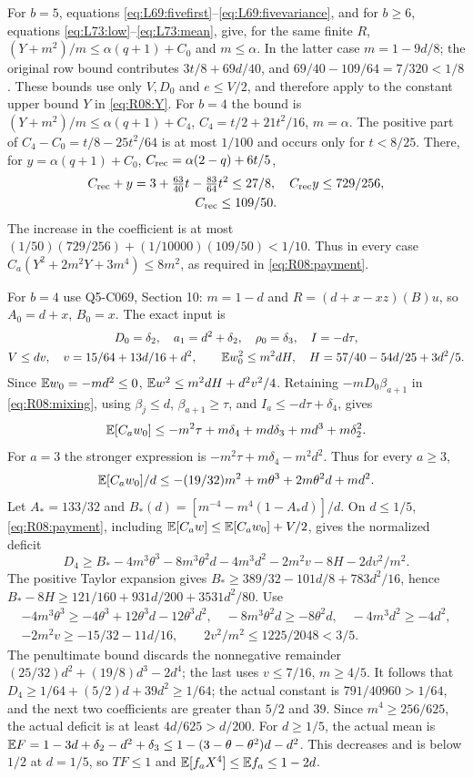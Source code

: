 For $b=5$, equations \eqref{eq:L69:fivefirst}--\eqref{eq:L69:fivevariance}, and for $b\ge6$, equations \eqref{eq:L73:low}--\eqref{eq:L73:mean}, give, for the same finite $R$,
$ (Y+m^2)/m\le\alpha(q+1)+C_0$ and $m\le\alpha$.
In the latter case $m=1-9d/8$; the original row bound contributes
$3t/8+69d/40$, and $69/40-109/64=7/320<1/8$.
These bounds use only $V,D_0$ and $e\le V/2$, and therefore apply to
the constant upper bound $Y$ in \eqref{eq:R08:Y}.
For $b=4$ the bound is $ (Y+m^2)/m\le\alpha(q+1)+C_4$,
$C_4=t/2+21t^2/16$, $m=\alpha$. The positive part of
$C_4-C_0=t/8-25t^2/64$ is at most $1/100$ and occurs only for
$t<8/25$. There, for $y=\alpha(q+1)+C_0$,
$C_{\rm rec}=\alpha(2-q)+6t/5$,
\[
\begin{gathered}
C_{\rm rec}+y=3+\tfrac{63}{40}t-\tfrac{83}{64}t^2\le27/8,\quad C_{\rm rec}y\le729/256,\\
C_{\rm rec}\le109/50.
\end{gathered}
\]
The increase in the coefficient is at most
$(1/50)(729/256)+(1/10000)(109/50)<1/10$.
Thus in every case
$C_a(Y^2+2m^2Y+3m^4)\le8m^2$, as required in
\eqref{eq:R08:payment}.

For $b=4$ use Q5-C069, Section 10: $m=1-d$ and
$R=(d+x-xz)(B)u$, so $A_0=d+x$, $B_0=x$. The exact input is
\[
\begin{gathered}
D_0=\delta_2,\quad a_1=d^2+\delta_2,\quad\rho_0=\delta_3,
\quad I=-d\tau,\\
V\le dv,\quad v=15/64+13d/16+d^2,\qquad
\mathbb E w_0^2\le m^2dH,\quad H=57/40-54d/25+3d^2/5.
\end{gathered}
\]
Since $\mathbb E w_0=-md^2\le0$, $\mathbb E w^2\le m^2dH+d^2v^2/4$.
Retaining $-mD_0\beta_{a+1}$ in \eqref{eq:R08:mixing}, using
$\beta_j\le d$, $\beta_{a+1}\ge\tau$, and
$I_a\le-d\tau+\delta_4$, gives
\[
\mathbb E[C_aw_0]\le-m^2\tau+m\delta_4+md\delta_3+md^3+m\delta_2^2.
\]
For $a=3$ the stronger expression is
$-m^2\tau+m\delta_4-m^2d^2$. Thus for every $a\ge3$,
\[
 \mathbb E[C_aw_0]/d\le-(19/32)m^2+m\theta^3+2m\theta^2d+md^2.
\]
Let $A_*=133/32$ and
$B_*(d)=[m^{-4}-m^4(1-A_*d)]/d$.
On $d\le1/5$, \eqref{eq:R08:payment}, including
$\mathbb E[C_aw]\le\mathbb E[C_aw_0]+V/2$, gives the normalized deficit
\[
D_4\ge B_*-4m^3\theta^3-8m^3\theta^2d-4m^3d^2
-2m^2v-8H-2dv^2/m^2.
\]
The positive Taylor expansion gives
$B_*\ge389/32-101d/8+783d^2/16$, hence
$B_*-8H\ge121/160+931d/200+3531d^2/80$.
Use
\[
\begin{gathered}
-4m^3\theta^3\ge-4\theta^3+12\theta^3d-12\theta^3d^2,\quad
-8m^3\theta^2d\ge-8\theta^2d,\quad-4m^3d^2\ge-4d^2,\\
-2m^2v\ge-15/32-11d/16,\qquad2v^2/m^2\le1225/2048<3/5.
\end{gathered}
\]
The penultimate bound discards the nonnegative remainder
$(25/32)d^2+(19/8)d^3-2d^4$; the last uses $v\le7/16$, $m\ge4/5$.
It follows that $D_4\ge1/64+(5/2)d+39d^2\ge1/64$;
the actual constant is $791/40960>1/64$, and the next two coefficients
are greater than $5/2$ and $39$. Since $m^4\ge256/625$, the actual
deficit is at least $4d/625>d/200$.
For $d\ge1/5$, the actual mean is
$\mathbb E F=1-3d+\delta_2-d^2+\delta_3
\le1-(3-\theta-\theta^2)d-d^2$.
This decreases and is below $1/2$ at $d=1/5$, so $TF\le1$ and
$\mathbb E[f_aX^4]\le\mathbb E f_a\le1-2d$.

